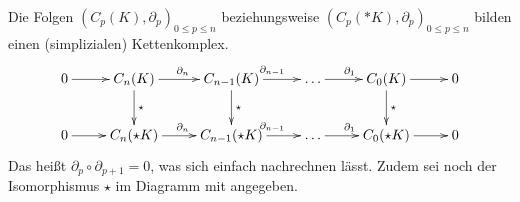   \begin{folgerung}
    \label{folgSimplizialerKettenkomplex}
    Die Folgen \( \left( C_{p}(K), \partial_{p} \right)_{0 \le p \le n} \) beziehungsweise \( \left( C_{p}(*K), \partial_{p} \right)_{0 \le p \le n} \) 
    bilden einen (simplizialen) Kettenkomplex.
    \begin{align}
      \begin{xy}
        \xymatrix{
          0 \ar[r] & 
          C_{n}(K) \ar[r]^{\partial_{n}} \ar[d]^{\star} & 
          C_{n-1}(K) \ar[r]^{\partial_{n-1}} \ar[d]^{\star} & 
          \ldots \ar[r]^{\partial_{1}} & 
          C_{0}(K) \ar[r] \ar[d]^{\star} &
          0 \\
          0 \ar[r] & 
          C_{n}(\star K) \ar[r]^{\partial_{n}} & 
          C_{n-1}( \star K) \ar[r]^{\partial_{n-1}} & 
          \ldots \ar[r]^{\partial_{1}} & 
          C_{0}(\star K) \ar[r] &
          0 
        }
      \end{xy}
    \end{align}
    Das heißt \( \partial_{p} \circ \partial_{p+1} = 0\), was sich einfach nachrechnen lässt.
    Zudem sei noch der Isomorphismus \( \star \) im Diagramm mit angegeben.
  \end{folgerung}



